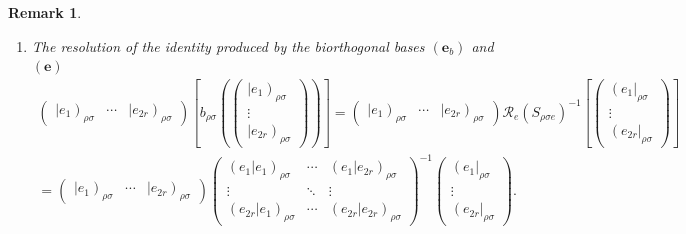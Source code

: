 \documentclass[aps,preprint]{revtex4}
\newtheorem{remark}[theorem]{Remark}
\begin{document}
\begin{remark}
\begin{enumerate}
\begin{enumerate}
\item The resolution of the identity produced by the biorthogonal bases $%
\left( \mathbf{e}_{b}\right) $ and $\left( \mathbf{e}\right) $ 
\begin{gather}
\left( 
\begin{array}{ccc}
\left\vert e_{1}\right) _{\rho \sigma } & \cdots & \left\vert e_{2r}\right)
_{\rho \sigma }%
\end{array}%
\right) \left[ b_{\rho \sigma }\left( \left( 
\begin{array}{c}
\left\vert e_{1}\right) _{\rho \sigma } \\ 
\vdots \\ 
\left\vert e_{2r}\right) _{\rho \sigma }%
\end{array}%
\right) \right) \right] =\left( 
\begin{array}{ccc}
\left\vert e_{1}\right) _{\rho \sigma } & \cdots & \left\vert e_{2r}\right)
_{\rho \sigma }%
\end{array}%
\right) \mathcal{R}_{e}\left( S_{\rho \sigma e}\right) ^{-1}\left[ \left( 
\begin{array}{c}
\left( e_{1}\right\vert _{\rho \sigma } \\ 
\vdots \\ 
\left( e_{2r}\right\vert _{\rho \sigma }%
\end{array}%
\right) \right] \\
=\left( 
\begin{array}{ccc}
\left\vert e_{1}\right) _{\rho \sigma } & \cdots & \left\vert e_{2r}\right)
_{\rho \sigma }%
\end{array}%
\right) \left( 
\begin{array}{ccc}
\left( \left. e_{1}\right\vert e_{1}\right) _{\rho \sigma } & \cdots & 
\left( \left. e_{1}\right\vert e_{2r}\right) _{\rho \sigma } \\ 
\vdots & \ddots & \vdots \\ 
\left( \left. e_{2r}\right\vert e_{1}\right) _{\rho \sigma } & \cdots & 
\left( \left. e_{2r}\right\vert e_{2r}\right) _{\rho \sigma }%
\end{array}%
\right) ^{-1}\left( 
\begin{array}{c}
\left( e_{1}\right\vert _{\rho \sigma } \\ 
\vdots \\ 
\left( e_{2r}\right\vert _{\rho \sigma }%
\end{array}%
\right) .
\end{gather}
\end{enumerate}
\end{enumerate}
\end{remark}
\end{document}

